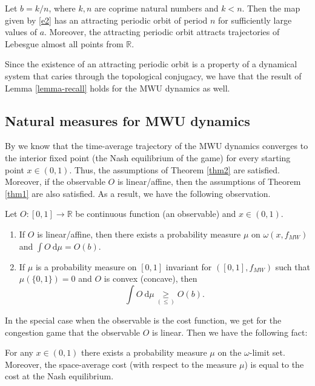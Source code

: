 \documentclass[format=acmsmall, authorversion, screen=true]{acmart}
\def\R{\ensuremath{\mathbb{R}}}
\def\dmu{\mathrm{d}\mu}
\begin{document}
\begin{lemma}\label{lemma-recall}
Let $b = k/n$, where $k,n$ are coprime natural numbers and $k<n$. Then the map given by \eqref{e2} has an attracting periodic orbit of period $n$ for sufficiently large values of $a$.
Moreover, the attracting periodic orbit attracts trajectories of Lebesgue almost all points from $\R$.
\end{lemma}

Since the existence of an attracting periodic orbit is a property of a dynamical system that caries through the topological conjugacy, we have that the result of Lemma \ref{lemma-recall} holds for the MWU dynamics as well.

\subsection{Natural measures for MWU dynamics}
\label{sec:theoMWU}
By \cite{chotibut2021family} we know that the time-average trajectory of the MWU dynamics converges to the interior fixed point (the Nash equilibrium of the game) for every starting point $x \in (0,1)$. Thus, the assumptions of Theorem \ref{thm2} are satisfied. Moreover, if the observable $O$ is linear/affine, then the assumptions of Theorem \ref{thm1} are also satisfied. As a result, we have the following observation.

\begin{corollary}
Let $O:[0,1]\to\R$ be continuous function (an observable) and $x \in (0,1)$.
 \begin{enumerate}
\item If $O$ is linear/affine, then there exists a probability measure $\mu$ on $\omega(x,f_{MW})$ and
 $\int O\: \dmu = O(b)$.


\item If $\mu$ is a probability measure on $[0,1]$ invariant for $([0,1],f_{MW})$ such that $\mu(\{0,1\})=0$ and $O$ is convex (concave), then
\[
 \int O\: \dmu \underset{(\leqslant)}{\geqslant} O(b).
\]
\end{enumerate}
\end{corollary}

In the special case when the observable is the cost function, we get for the congestion game that the observable $O$ is linear. Then we have the following fact:

\begin{corollary}
For any $x \in (0,1)$ there exists a probability measure $\mu$ on the $\omega$-limit set.  Moreover, the space-average cost (with respect to the measure $\mu$) is equal to the cost at the Nash equilibrium.
\end{corollary}
\end{document}
